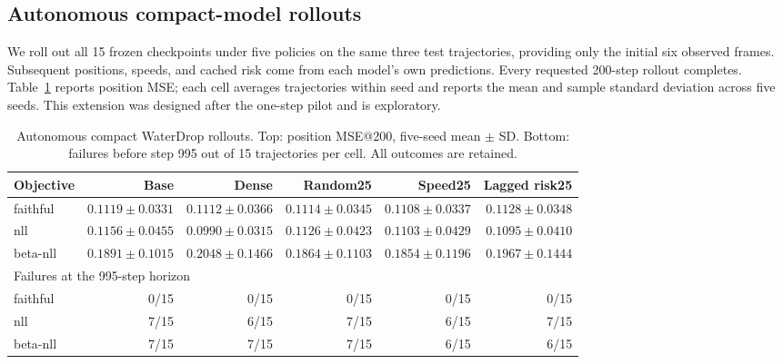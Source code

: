 \subsection{Autonomous compact-model rollouts}

We roll out all 15 frozen checkpoints under five policies on the same three test trajectories, providing only the initial six observed frames. Subsequent positions, speeds, and cached risk come from each model's own predictions. Every requested 200-step rollout completes. Table~\ref{tab:rollout} reports position MSE; each cell averages trajectories within seed and reports the mean and sample standard deviation across five seeds. This extension was designed after the one-step pilot and is exploratory.

\begin{table}[t]

\centering\small

\caption{Autonomous compact WaterDrop rollouts. Top: position MSE@200, five-seed mean $\pm$ SD. Bottom: failures before step 995 out of 15 trajectories per cell. All outcomes are retained.}

\label{tab:rollout}

\begin{tabular}{lrrrrr}

\toprule

Objective & Base & Dense & Random25 & Speed25 & Lagged risk25\\

\midrule

faithful & $0.1119\pm0.0331$ & $0.1112\pm0.0366$ & $0.1114\pm0.0345$ & $0.1108\pm0.0337$ & $0.1128\pm0.0348$\\

nll & $0.1156\pm0.0455$ & $0.0990\pm0.0315$ & $0.1126\pm0.0423$ & $0.1103\pm0.0429$ & $0.1095\pm0.0410$\\

beta-nll & $0.1891\pm0.1015$ & $0.2048\pm0.1466$ & $0.1864\pm0.1103$ & $0.1854\pm0.1196$ & $0.1967\pm0.1444$\\

\midrule

\multicolumn{6}{l}{Failures at the 995-step horizon}\\

faithful & 0/15 & 0/15 & 0/15 & 0/15 & 0/15\\

nll & 7/15 & 6/15 & 7/15 & 6/15 & 7/15\\

beta-nll & 7/15 & 7/15 & 7/15 & 6/15 & 6/15\\

\bottomrule

\end{tabular}

\end{table}

